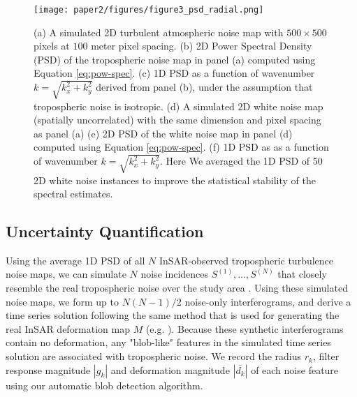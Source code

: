 \documentclass{utexasthesis}
\begin{document}


\begin{figure}[hbt!]
\centering 
\texttt{[image: paper2/figures/figure3\_psd\_radial.png]}
\caption{
(a) A simulated 2D turbulent atmospheric noise map with $ 500 \times 500 $ pixels at $100$ meter pixel spacing.
(b) 2D Power Spectral Density (PSD) of the tropospheric noise map in panel (a) computed using Equation \eqref{eq:pow-spec}.
(c) 1D PSD as a function of wavenumber $k = \sqrt{k_x^2 + k_y^2}$ derived from panel (b), under the assumption that tropospheric noise is isotropic.
(d) A simulated 2D white noise map (spatially uncorrelated) with the same dimension and pixel spacing as panel (a)
(e) 2D PSD of the white noise map in panel (d) computed using Equation \eqref{eq:pow-spec}.
(f) 1D PSD as as a function of wavenumber $k = \sqrt{k_x^2 + k_y^2}$. Here We averaged the 1D PSD of 50  2D white noise instances to improve the statistical stability of the spectral estimates.
}
\label{fig:psd-example}
\end{figure}



\subsection{Uncertainty Quantification}
\label{subsec:methods-3-noise-sim}

Using the average 1D PSD of all $N$ InSAR-observed tropospheric turbulence noise maps, we can simulate $N$ noise incidences  $S^{(1)},\dots, S^{(N)} $ that closely resemble the real tropospheric noise over the study area \citep{Hanssen2001RadarInterferometryData}. Using these simulated noise maps, we form up to $N(N-1)/2$ noise-only interferograms, and derive a time series solution following the same method that is used for generating the real InSAR deformation map $M$ (e.g. \citep{Sandwell1998PhaseGradientApproach, Berardino2002NewAlgorithmSurface}). Because these synthetic interferograms contain no deformation, any "blob-like" features in the simulated time series solution are associated with tropospheric noise. We record the radius $r_k$,  filter response magnitude $|g_k|$ and deformation magnitude $|\bar{d_k}|$ of each noise feature using our automatic blob detection algorithm.
\end{document}
